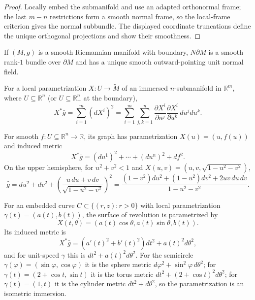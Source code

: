 \begin{proof}
\sketch Locally embed the submanifold and use an adapted orthonormal frame; the last $m-n$ restrictions form a smooth normal frame, so the local-frame criterion gives the normal subbundle. The displayed coordinate truncations define the unique orthogonal projections and show their smoothness.
\end{proof}

\begin{proposition}
\label{prop:outward-pointing-normal}
If $(M,g)$ is a smooth Riemannian manifold with boundary, $N\partial M$ is a smooth rank-$1$ bundle over $\partial M$ and has a unique smooth outward-pointing unit normal field.
\end{proposition}

For a local parametrization $X:U\to\widetilde M$ of an immersed $n$-submanifold in $\mathbb R^m$, where $U\subseteq\mathbb R^n$ (or $U\subseteq\mathbb R^n_+$ at the boundary),
\[
X^*\bar g=\sum_{i=1}^m(dX^i)^2
=\sum_{i=1}^m\sum_{j,k=1}^n\frac{\partial X^i}{\partial u^j}\frac{\partial X^i}{\partial u^k}\,du^jdu^k.
\]

\begin{example}
\label{ex:metrics-in-graph-coordinates}





For smooth $f:U\subseteq\mathbb R^n\to\mathbb R$, its graph has parametrization $X(u)=(u,f(u))$ and induced metric
\[
X^*\bar g=(du^1)^2+\cdots+(du^n)^2+df^2.
\]
On the upper hemisphere, for $u^2+v^2<1$ and $X(u,v)=(u,v,\sqrt{1-u^2-v^2})$,
\[
\hat g=du^2+dv^2+\left(\frac{u\,du+v\,dv}{\sqrt{1-u^2-v^2}}\right)^2
 =\frac{(1-v^2)du^2+(1-u^2)dv^2+2uv\,du\,dv}{1-u^2-v^2}.
\]
\end{example}

\begin{example}
\label{ex:surfaces-of-revolution}




For an embedded curve $C\subset\{(r,z):r>0\}$ with local parametrization $\gamma(t)=(a(t),b(t))$, the surface of revolution is parametrized by
\[
X(t,\theta)=(a(t)\cos\theta,a(t)\sin\theta,b(t)).\tag{2.11}
\]
Its induced metric is
\[
X^*\bar g=(a'(t)^2+b'(t)^2)dt^2+a(t)^2d\theta^2,
\]
and for unit-speed $\gamma$ this is $dt^2+a(t)^2d\theta^2$. For the semicircle $\gamma(\varphi)=(\sin\varphi,\cos\varphi)$ it is the sphere metric $d\varphi^2+\sin^2\varphi\,d\theta^2$; for $\gamma(t)=(2+\cos t,\sin t)$ it is the torus metric $dt^2+(2+\cos t)^2d\theta^2$; for $\gamma(t)=(1,t)$ it is the cylinder metric $dt^2+d\theta^2$, so the parametrization is an isometric immersion.
\end{example}

